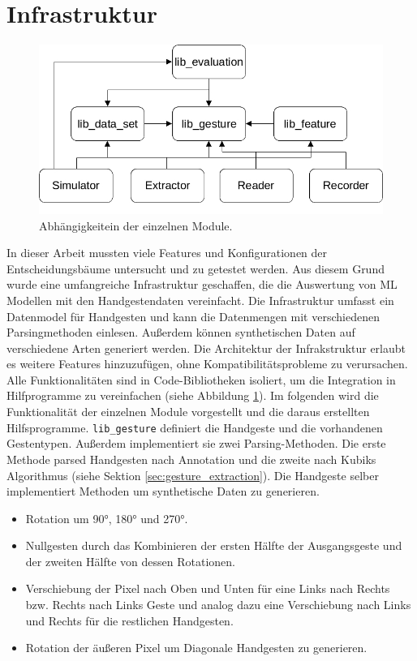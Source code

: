 \section{Infrastruktur}
\label{sec:recorder}
\begin{figure}
    \centering
    \includegraphics[width=0.75\linewidth]{images/architecture_overview.jpg}
    \caption{Abhängigkeitein der einzelnen Module.}
    \label{fig:architecture_overview}
\end{figure}
In dieser Arbeit mussten viele Features und Konfigurationen der Entscheidungsbäume untersucht und zu getestet werden. Aus diesem Grund wurde eine umfangreiche Infrastruktur geschaffen, die die
Auswertung von ML Modellen mit den Handgestendaten vereinfacht. Die Infrastruktur umfasst ein Datenmodel für Handgesten und kann die Datenmengen mit verschiedenen Parsingmethoden einlesen.
\newline
\newline
Außerdem können synthetischen Daten auf verschiedene Arten generiert werden. Die Architektur der Infrakstruktur erlaubt es weitere Features hinzuzufügen, ohne Kompatibilitätsprobleme zu verursachen.
Alle Funktionalitäten sind in Code-Bibliotheken isoliert, um die Integration in Hilfprogramme zu vereinfachen (siehe Abbildung \ref{fig:architecture_overview}).
\newline
\newline
Im folgenden wird die Funktionalität der einzelnen Module vorgestellt und die daraus erstellten Hilfsprogramme.
\newline
\newline
\texttt{lib\_gesture} definiert die Handgeste und die vorhandenen Gestentypen. Außerdem implementiert sie zwei Parsing-Methoden. Die erste Methode parsed Handgesten nach Annotation und die
zweite nach Kubiks Algorithmus (siehe Sektion \ref{sec:gesture_extraction}). Die Handgeste selber implementiert Methoden um synthetische Daten zu generieren.
\begin{itemize}
    \item Rotation um 90°, 180° und 270°.
    \item Nullgesten durch das Kombinieren der ersten Hälfte der Ausgangsgeste und der zweiten Hälfte von dessen Rotationen.
    \item Verschiebung der Pixel nach Oben und Unten für eine Links nach Rechts bzw. Rechts nach Links Geste und analog dazu eine Verschiebung nach Links und Rechts für die restlichen Handgesten.
    \item Rotation der äußeren Pixel um Diagonale Handgesten zu generieren.
\end{itemize}
